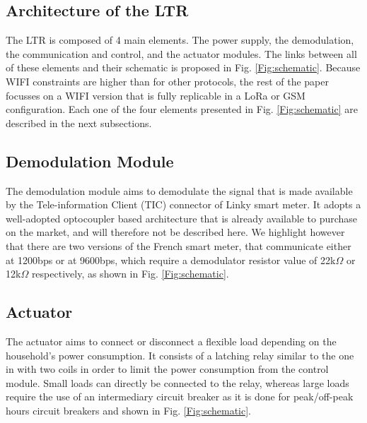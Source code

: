 \documentclass[conference]{IEEEtran}
\begin{document}
\subsection{Architecture of the LTR}
The LTR is composed of 4 main elements. The power supply, the demodulation, the communication and control, and the actuator modules.   The links between all of these elements and their schematic is proposed in Fig. \ref{Fig:schematic}. Because WIFI constraints are higher than for other protocols, the rest of the paper focusses on a WIFI version
 that is fully replicable in a LoRa or GSM configuration. Each one of the four elements presented in Fig. \ref{Fig:schematic} are described in the next subsections.





\subsection{Demodulation Module}
The demodulation module aims to demodulate the signal that is made available by the Tele-information Client (TIC) connector of Linky smart meter. It adopts a well-adopted optocoupler based architecture that is already available to purchase on the market, and will therefore not be described here. We highlight however that there are two versions of the French smart meter, that communicate either at 1200bps or at 9600bps, which require a demodulator resistor value of 
22k$\Omega$ or 12k$\Omega$ respectively, as  shown in Fig. \ref{Fig:schematic}. 

\subsection{Actuator}
The actuator aims to connect or disconnect a flexible load depending on the household's power consumption. It consists of a latching relay similar to the one in \cite{adafruit:latchingrelay} with two coils in order to limit the power consumption from the control module. 
Small loads can directly be connected to the relay, whereas large loads require the use of an intermediary circuit breaker as it is done for peak/off-peak hours circuit breakers \cite{schneider:circuitbreaker} and shown in Fig. \ref{Fig:schematic}.
\end{document}
